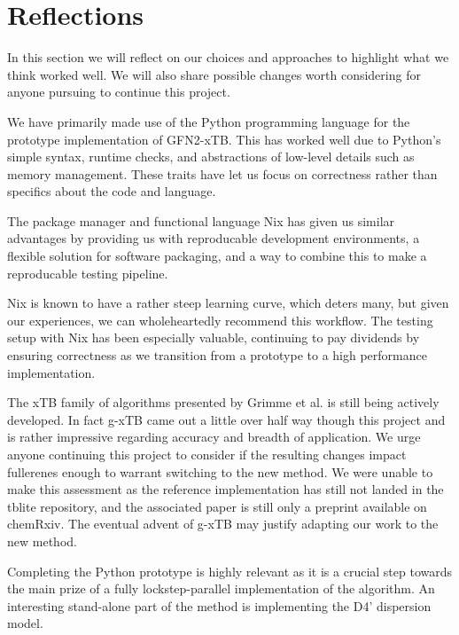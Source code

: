 \chapter{Reflections}\label{sec:reflection}
In this section we will reflect on our choices and approaches to highlight what we think worked well. We will also share possible changes worth considering for anyone pursuing to continue this project.%

We have primarily made use of the Python programming language for the prototype implementation of GFN2-xTB. This has worked well due to Python's simple syntax, runtime checks, and abstractions of low-level details such as memory management. These traits have let us focus on correctness rather than specifics about the code and language.

The package manager and functional language Nix has given us similar advantages by providing us with reproducable development environments, a flexible solution for software packaging, and a way to combine this to make a reproducable testing pipeline. %

Nix is known to have a rather steep learning curve, which deters many, but given our experiences, we can wholeheartedly recommend this workflow. The testing setup with Nix has been especially valuable, continuing to pay dividends by ensuring correctness as we transition from a prototype to a high performance implementation.

The xTB family of algorithms presented by Grimme et al. is still being actively developed. In fact g-xTB came out a little over half way though this project and is rather impressive regarding accuracy and breadth of application. We urge anyone continuing this project to consider if the resulting changes impact fullerenes enough to warrant switching to the new method. We were unable to make this assessment as the reference implementation has still not landed in the tblite repository, and the associated paper is still only a preprint available on chemRxiv\cite{g-xtb}. 
The eventual advent of g-xTB may justify adapting our work to the new method. 

Completing the Python prototype is highly relevant as it is a crucial step towards the main prize of a fully lockstep-parallel implementation of the algorithm. 
An interesting stand-alone part of the method is implementing the D4' dispersion model. 

